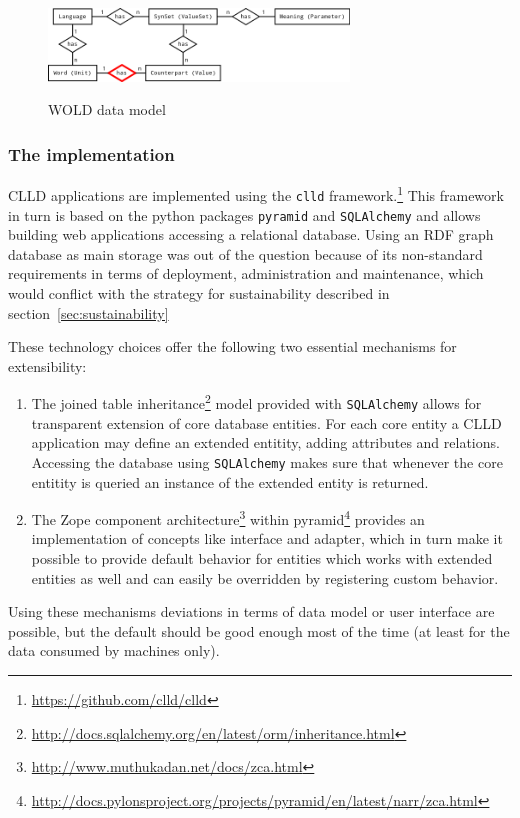\documentclass[a4paper,10pt]{article}
\begin{document}
\begin{figure}[h!]
  \caption{WOLD data model}
  \centering
\includegraphics[width=8cm]{wold_erd.png}
\label{wolddatamodel}
\end{figure}


\subsubsection{The implementation}
\label{sec:implementation}
CLLD applications are implemented using the \texttt{clld} framework.\footnote{\url{https://github.com/clld/clld}}
This framework in turn is based on the python packages \texttt{pyramid} and \texttt{SQLAlchemy} and allows building web applications accessing a relational database.
Using an RDF graph database as main storage was out of the question because of its non-standard requirements
in terms of deployment, administration and maintenance, which would conflict with the strategy for sustainability described in section~\ref{sec:sustainability}

These technology choices offer the following two essential mechanisms for extensibility:
\begin{enumerate}
\item The joined table inheritance\footnote{\url{http://docs.sqlalchemy.org/en/latest/orm/inheritance.html}} model provided with \texttt{SQLAlchemy} allows for transparent extension of core database entities. For each core entity
a CLLD application may define an extended entitity, adding attributes and relations. Accessing the database using \texttt{SQLAlchemy} makes sure
that whenever the core entitity is queried an instance of the extended entity is returned.
\item The Zope component architecture\footnote{\url{http://www.muthukadan.net/docs/zca.html}} within pyramid\footnote{\url{http://docs.pylonsproject.org/projects/pyramid/en/latest/narr/zca.html}} provides an implementation of concepts like interface and adapter, which in turn make it possible to provide
default behavior for entities which works with extended entities as well and can easily be overridden by registering custom behavior.
\end{enumerate}

Using these mechanisms deviations in terms of data model or user interface are possible, but the default 
should be good enough most of the time (at least for the data consumed by machines only).
\end{document}

